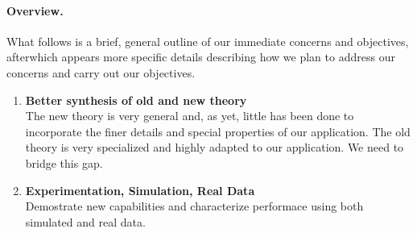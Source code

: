 \paragraph{Overview.}  What follows is a brief, general outline of our
immediate concerns and objectives, afterwhich appears more specific details
describing how we plan to address our concerns and carry out our objectives.
\begin{enumerate}
\item {\bf Better synthesis of old and new theory}\\
The new theory is very general and, as yet, little has been done to
incorporate the finer details and special properties of our application.  
The old theory is very specialized and highly adapted to our application.  
We need to bridge this gap.
\item {\bf Experimentation, Simulation, Real Data}\\
Demostrate new capabilities and characterize performace using both simulated
and real data. 
\end{enumerate}

